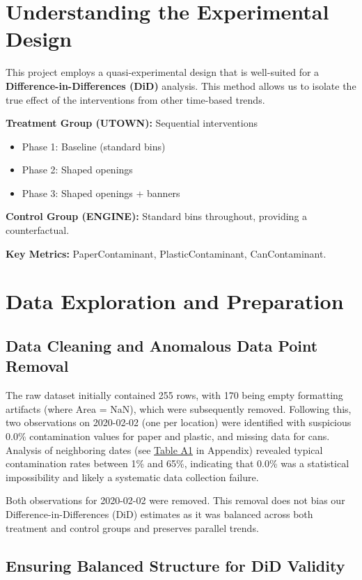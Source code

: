 \documentclass[12pt]{article}
\begin{document}
\section{Understanding the Experimental Design}

This project employs a quasi-experimental design that is well-suited for a \textbf{Difference-in-Differences (DiD)} analysis. This method allows us to isolate the true effect of the interventions from other time-based trends.

\textbf{Treatment Group (UTOWN):} Sequential interventions
\begin{itemize}
    \item Phase 1: Baseline (standard bins)
    \item Phase 2: Shaped openings
    \item Phase 3: Shaped openings + banners
\end{itemize}

\textbf{Control Group (ENGINE):} Standard bins throughout, providing a counterfactual.

\textbf{Key Metrics:} PaperContaminant, PlasticContaminant, CanContaminant.

\section{Data Exploration and Preparation}

\subsection{Data Cleaning and Anomalous Data Point Removal}

The raw dataset initially contained 255 rows, with 170 being empty formatting artifacts (where Area = NaN), which were subsequently removed. Following this, two observations on 2020-02-02 (one per location) were identified with suspicious 0.0\% contamination values for paper and plastic, and missing data for cans. Analysis of neighboring dates (see \hyperref[tab:feb2]{Table A1} in Appendix) revealed typical contamination rates between 1\% and 65\%, indicating that 0.0\% was a statistical impossibility and likely a systematic data collection failure.

Both observations for 2020-02-02 were removed. This removal does not bias our Difference-in-Differences (DiD) estimates as it was balanced across both treatment and control groups and preserves parallel trends.

\subsection{Ensuring Balanced Structure for DiD Validity}
\end{document}
